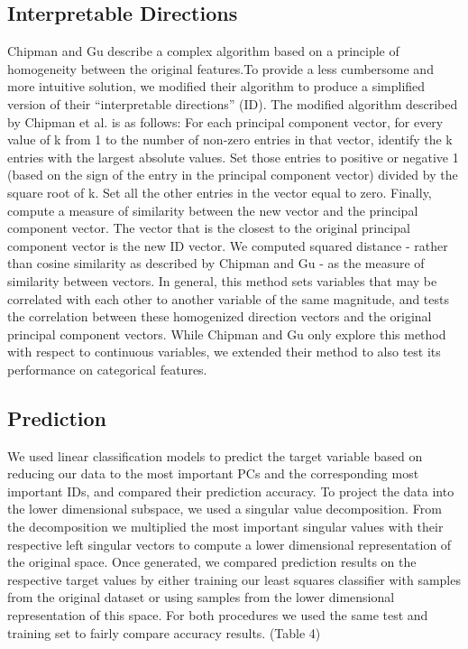 \documentclass{article}
\begin{document}
{\subsection{Interpretable Directions}{Chipman and Gu describe a complex algorithm based on a principle of homogeneity between the original features.To provide a less cumbersome and more intuitive solution, we modified their algorithm to produce a simplified version of their “interpretable directions” (ID). 
The modified algorithm described by Chipman et al. is as follows: 
For each principal component vector, for every value of k from 1 to the number of non-zero entries in that vector, identify the k entries with the largest absolute values. Set those entries to positive or negative 1 (based on the sign of the entry in the principal component vector) divided by the square root of k. Set all the other entries in the vector equal to zero. Finally, compute a measure of similarity between the new vector and the principal component vector. The vector that is the closest to the original principal component vector is the new ID vector. We computed squared distance - rather than cosine similarity as described by Chipman and Gu - as the measure of similarity between vectors. 	
In general, this method sets variables that may be correlated with each other to another variable of the same magnitude, and tests the correlation between these homogenized direction vectors and the original principal component vectors. While Chipman and Gu only explore this method with respect to continuous variables, we extended their method to also test its performance on categorical features.
}


\subsection{Prediction}{We used linear classification models to predict the target variable based on reducing our data to the most important PCs and the corresponding most important IDs, and compared their prediction accuracy. To project the data into the lower dimensional subspace, we used a singular value decomposition. From the decomposition we multiplied the most important singular values with their respective left singular vectors to compute a lower dimensional representation of the original space. Once generated, we compared prediction results on the respective target values by either training our least squares classifier with samples from the original dataset or using samples from the lower dimensional representation of this space. For both procedures we used the same test and training set to fairly compare accuracy results. (Table 4)}
}
\end{document}
